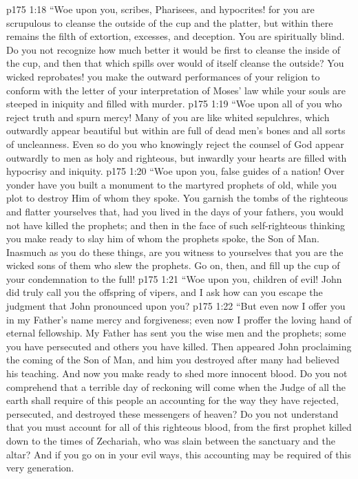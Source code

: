\vs p175 1:18 \textcolor{ubdarkred}{“Woe upon you, scribes, Pharisees, and hypocrites! for you are scrupulous to cleanse the outside of the cup and the platter, but within there remains the filth of extortion, excesses, and deception. You are spiritually blind. Do you not recognize how much better it would be first to cleanse the inside of the cup, and then that which spills over would of itself cleanse the outside? You wicked reprobates! you make the outward performances of your religion to conform with the letter of your interpretation of Moses’ law while your souls are steeped in iniquity and filled with murder.}
\vs p175 1:19 \textcolor{ubdarkred}{“Woe upon all of you who reject truth and spurn mercy! Many of you are like whited sepulchres, which outwardly appear beautiful but within are full of dead men’s bones and all sorts of uncleanness. Even so do you who knowingly reject the counsel of God appear outwardly to men as holy and righteous, but inwardly your hearts are filled with hypocrisy and iniquity.}
\vs p175 1:20 \textcolor{ubdarkred}{“Woe upon you, false guides of a nation! Over yonder have you built a monument to the martyred prophets of old, while you plot to destroy Him of whom they spoke. You garnish the tombs of the righteous and flatter yourselves that, had you lived in the days of your fathers, you would not have killed the prophets; and then in the face of such self\hyp{}righteous thinking you make ready to slay him of whom the prophets spoke, the Son of Man. Inasmuch as you do these things, are you witness to yourselves that you are the wicked sons of them who slew the prophets. Go on, then, and fill up the cup of your condemnation to the full!}
\vs p175 1:21 \textcolor{ubdarkred}{“Woe upon you, children of evil! John did truly call you the offspring of vipers, and I ask how can you escape the judgment that John pronounced upon you?}
\vs p175 1:22 \textcolor{ubdarkred}{“But even now I offer you in my Father’s name mercy and forgiveness; even now I proffer the loving hand of eternal fellowship. My Father has sent you the wise men and the prophets; some you have persecuted and others you have killed. Then appeared John proclaiming the coming of the Son of Man, and him you destroyed after many had believed his teaching. And now you make ready to shed more innocent blood. Do you not comprehend that a terrible day of reckoning will come when the Judge of all the earth shall require of this people an accounting for the way they have rejected, persecuted, and destroyed these messengers of heaven? Do you not understand that you must account for all of this righteous blood, from the first prophet killed down to the times of Zechariah, who was slain between the sanctuary and the altar? And if you go on in your evil ways, this accounting may be required of this very generation.}
